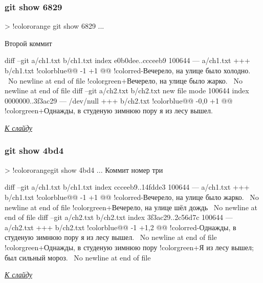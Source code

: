 \documentclass[9pt, aspectratio=1610]{beamer}
\begin{document}
\begin{frame}[fragile=singleslide]\frametitle{git show 6829}\label{f:show2}
	
	\begin{VerbatimCmd}[gobble=2,fontsize=\footnotesize]
		
		> !color{orange} git show 6829
		...
		
		Второй коммит
		
		diff --git a/ch1.txt b/ch1.txt
		index e0b0dee..ccceeb9 100644
		--- a/ch1.txt
		+++ b/ch1.txt
		!color{blue}@@ -1 +1 @@
		!color{red}-Вечерело, на улице было холодно.
		\ No newline at end of file
		!color{green}+Вечерело, на улице было жарко.
		\ No newline at end of file
		diff --git a/ch2.txt b/ch2.txt
		new file mode 100644
		index 0000000..3f3ac29
		--- /dev/null
		+++ b/ch2.txt
		!color{blue}@@ -0,0 +1 @@
		!color{green}+Однажды, в студеную зимнюю пору я из лесу вышел.
		
	\end{VerbatimCmd}
	
	\hyperlink{f:show_back}{\color{cyan}\itshape К слайду}
	
\end{frame}

\begin{frame}[fragile=singleslide]\frametitle{git show 4bd4}\label{f:show3}
	
	\begin{VerbatimCmd}[gobble=2,fontsize=\footnotesize]
		
		> !color{orange}git show 4bd4
		...		
		Коммит номер три
		
		diff --git a/ch1.txt b/ch1.txt
		index ccceeb9..14fdde3 100644
		--- a/ch1.txt
		+++ b/ch1.txt
		!color{blue}@@ -1 +1 @@
		!color{red}-Вечерело, на улице было жарко.
		\ No newline at end of file
		!color{green}+Вечерело, на улице шёл дождь
		\ No newline at end of file
		diff --git a/ch2.txt b/ch2.txt
		index 3f3ac29..2c56d7c 100644
		--- a/ch2.txt
		+++ b/ch2.txt
		!color{blue}@@ -1 +1,2 @@
		!color{red}-Однажды, в студеную зимнюю пору я из лесу вышел.
		\ No newline at end of file
		!color{green}+Однажды, в студеную зимнюю пору 
		!color{green}+Я из лесу вышел; был сильный мороз.
		\ No newline at end of file
		
	\end{VerbatimCmd}
	
	\hyperlink{f:show_back}{\color{cyan}\itshape К слайду}
	
\end{frame}


	
\end{document}
